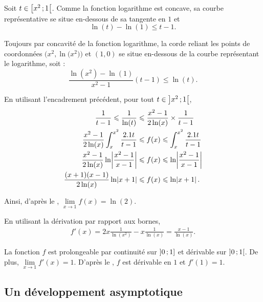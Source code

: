 \begin{elemsolution}
\begin{reponses}
\item Soit $t \in \left[x^2\,;1\right[$. Comme la fonction logarithme est concave, sa courbe représentative se situe en-dessous de sa tangente en $1$ et
\[
\ln(t) - \ln(1) \leqslant t - 1.
\]

\medskip

Toujours par concavité de la fonction logarithme, la corde reliant les points de coordonnées $\big(x^2, \ln\big(x^2\big)\big)$ et $(1, 0)$ se situe en-dessous de la courbe représentant le logarithme, soit :
\[
\frac{\ln(x^2) - \ln(1)}{x^2 - 1} (t - 1) \leqslant \ln(t).
\]

\item En utilisant l'encadrement précédent, pour tout $t \in \left]x^2\,;1\right[$,
\begin{align*}
\frac{1}{t - 1} \leqslant \frac{1}{\ln(t)} &\leqslant \frac{x^2 - 1}{2 \ln(x)} \times \frac{1}{t - 1}\\
\frac{x^2 - 1}{2 \ln(x)} \int_x^{x^2} \frac{2.1 t}{t - 1} &\leqslant f(x) \leqslant \int_x^{x^2} \frac{2.1 t}{t - 1}\\
\frac{x^2 - 1}{2 \ln(x)} \ln \mathopen{}\left| \frac{x^2 - 1}{x - 1} \right| &\leqslant f(x) \leqslant \ln\mathopen{}\left| \frac{x^2 - 1}{x - 1} \right|\\
\frac{(x + 1) (x - 1)}{2 \ln(x)} \ln\mathopen{}\left| x + 1 \right| &\leqslant f(x) \leqslant \ln\mathopen{}\left| x + 1 \right|.
\end{align*}

Ainsi, d'après le , $\lim\limits_{x\to 1} f(x) = \ln(2)$.

\item En utilisant la dérivation par rapport aux bornes,
\begin{align*}
f'(x)
= 2 x \frac{1}{\ln(x^2)} - x \frac{1}{\ln(x)} 
= \frac{x - 1}{\ln(x)}.
\end{align*}

La fonction $f$ est prolongeable par continuité sur $\left]0\,;1\right]$ et dérivable sur $\left]0\,;1\right[$. De plus, $\lim\limits_{x\to 1} f'(x) = 1$. D'après le , $f$ est dérivable en $1$ et $f'(1) = 1$.
\end{reponses}
\end{elemsolution}

\subsection{Un développement asymptotique}

